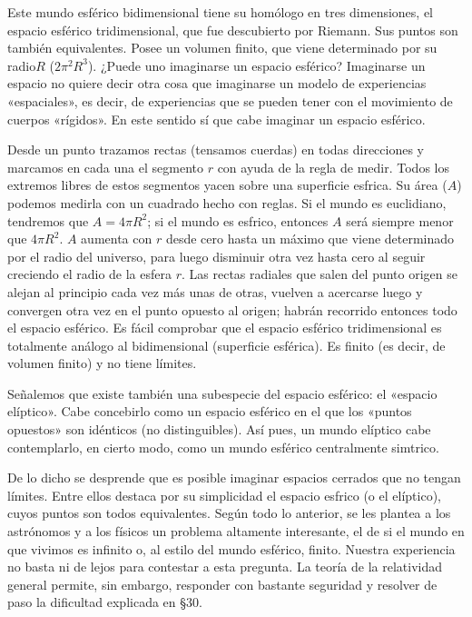 \documentclass[spanish]{book}
\begin{document}
Este mundo esférico bidimensional tiene su homólogo en tres dimensiones, el espacio
esférico tridimensional, que fue descubierto por Riemann. Sus puntos son también
equivalentes. Posee un volumen finito, que viene determinado por su radio$R$
($2\pi^{2}R^{3}$). ¿Puede uno imaginarse un espacio esférico? Imaginarse un espacio no quiere
decir otra cosa que imaginarse un modelo de experiencias «espaciales», es decir, de experiencias
que se pueden tener con el movimiento de cuerpos «rígidos». En este
sentido sí que cabe imaginar un espacio esférico.

Desde un punto trazamos rectas (tensamos cuerdas) en todas direcciones y
marcamos en cada una el segmento $r$ con ayuda de la regla de medir. Todos los
extremos libres de estos segmentos yacen sobre una superficie esfrica. Su área ($A$)
podemos medirla con un cuadrado hecho con reglas. Si el mundo es euclidiano,
tendremos que $A=4\pi R^{2}$; si el mundo es esfrico, entonces $A$ será siempre menor que
$4\pi R^{2}$. $A$ aumenta con $r$ desde cero hasta un máximo que viene determinado por el
radio del universo, para luego disminuir otra vez hasta cero al seguir creciendo el
radio de la esfera $r$. Las rectas radiales que salen del punto origen se alejan al
principio cada vez más unas de otras, vuelven a acercarse luego y convergen otra vez
en el punto opuesto al origen; habrán recorrido entonces todo el espacio esférico. Es
fácil comprobar que el espacio esférico tridimensional es totalmente análogo al
bidimensional (superficie esférica). Es finito (es decir, de volumen finito) y no tiene
límites.

Señalemos que existe también una subespecie del espacio esférico: el «espacio
elíptico». Cabe concebirlo como un espacio esférico en el que los «puntos opuestos»
son idénticos (no distinguibles). Así pues, un mundo elíptico cabe contemplarlo, en
cierto modo, como un mundo esférico centralmente simtrico.

De lo dicho se desprende que es posible imaginar espacios cerrados que no tengan
límites. Entre ellos destaca por su simplicidad el espacio esfrico (o el elíptico), cuyos
puntos son todos equivalentes. Según todo lo anterior, se les plantea a los
astrónomos y a los físicos un problema altamente interesante, el de si el mundo en
que vivimos es infinito o, al estilo del mundo esférico, finito. Nuestra experiencia
no basta ni de lejos para contestar a esta pregunta. La teoría de la relatividad general
permite, sin embargo, responder con bastante seguridad y resolver de paso la
dificultad explicada en \S 30.
\end{document}
